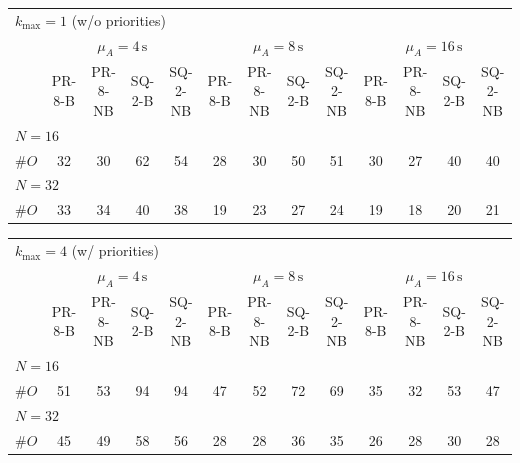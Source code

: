 \begin{tabular}{l c c c c c c c c c c c c}
\toprule
\multicolumn{13}{l}{$k_{\max}=1$ (w/o priorities)} \\
\addlinespace[0.2em]
 & \multicolumn{4}{c}{$\mu_A=4\,\mathrm{s}$} & \multicolumn{4}{c}{$\mu_A=8\,\mathrm{s}$} & \multicolumn{4}{c}{$\mu_A=16\,\mathrm{s}$} \\
\cmidrule(lr){2-5}\cmidrule(lr){6-9}\cmidrule(lr){10-13}
 & PR-8-B & PR-8-NB & SQ-2-B & SQ-2-NB & PR-8-B & PR-8-NB & SQ-2-B & SQ-2-NB & PR-8-B & PR-8-NB & SQ-2-B & SQ-2-NB \\
\midrule
\multicolumn{13}{l}{${N=16}$} \\
\midrule
$\#O$ & 32 & 30 & 62 & 54 & 28 & 30 & 50 & 51 & 30 & 27 & 40 & 40 \\
\midrule
\multicolumn{13}{l}{${N=32}$} \\
\midrule
$\#O$ & 33 & 34 & 40 & 38 & 19 & 23 & 27 & 24 & 19 & 18 & 20 & 21 \\
\bottomrule
\end{tabular}

\begin{tabular}{l c c c c c c c c c c c c}
\toprule
\multicolumn{13}{l}{$k_{\max}=4$ (w/ priorities)} \\
\addlinespace[0.2em]
 & \multicolumn{4}{c}{$\mu_A=4\,\mathrm{s}$} & \multicolumn{4}{c}{$\mu_A=8\,\mathrm{s}$} & \multicolumn{4}{c}{$\mu_A=16\,\mathrm{s}$} \\
\cmidrule(lr){2-5}\cmidrule(lr){6-9}\cmidrule(lr){10-13}
 & PR-8-B & PR-8-NB & SQ-2-B & SQ-2-NB & PR-8-B & PR-8-NB & SQ-2-B & SQ-2-NB & PR-8-B & PR-8-NB & SQ-2-B & SQ-2-NB \\
\midrule
\multicolumn{13}{l}{${N=16}$} \\
\midrule
$\#O$ & 51 & 53 & 94 & 94 & 47 & 52 & 72 & 69 & 35 & 32 & 53 & 47 \\
\midrule
\multicolumn{13}{l}{${N=32}$} \\
\midrule
$\#O$ & 45 & 49 & 58 & 56 & 28 & 28 & 36 & 35 & 26 & 28 & 30 & 28 \\
\bottomrule
\end{tabular}
